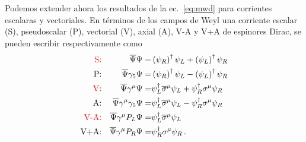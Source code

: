 Podemos extender ahora los resultados de la ec.~\eqref{eq:mwd} para corrientes escalaras y vectoriales. En términos de los campos de Weyl una corriente escalar (S), pseudoscalar (P), vectorial (V), axial (A),  V-A y V+A de espinores Dirac, se pueden escribir respectivamente como
\begin{align}
\label{eq:8}
\color{red}\text{S:} &&  \overline{\Psi}\Psi =& \left( \psi_R \right)^\dagger \psi_L+\left( \psi_L \right)^{\dagger}\psi_R \nonumber\\
\text{P:} &&  \overline{\Psi}\gamma_5\Psi =& \left( \psi_R \right)^\dagger \psi_L-\left( \psi_L \right)^{\dagger}\psi_R \nonumber\\
\color{red}\text{V:}& &  \overline{\Psi}\gamma^{\mu}\Psi=& \psi_L^{\dagger}\overline{\sigma}^{\mu}\psi_L+\psi_R^{\dagger}\sigma^{\mu}\psi_{R}\nonumber\\
\text{A:}& &  \overline{\Psi}\gamma^{\mu}\gamma_5\Psi=& \psi_L^{\dagger}\overline{\sigma}^{\mu}\psi_L-\psi_R^{\dagger}\sigma^{\mu}\psi_{R}\nonumber\\
\color{red}\text{V-A:} && \overline{\Psi}\gamma^{\mu}P_L\Psi=& \psi_L^{\dagger}\overline{\sigma}^{\mu}\psi_L\nonumber\\
\text{V+A:} && \overline{\Psi}\gamma^{\mu}P_R\Psi=& \psi_R^{\dagger}{\sigma}^{\mu}\psi_R\,.
\end{align}


